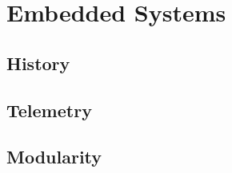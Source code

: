 \section{Embedded Systems} %


\subsection{History} %


\subsection{Telemetry}


\subsection{Modularity}